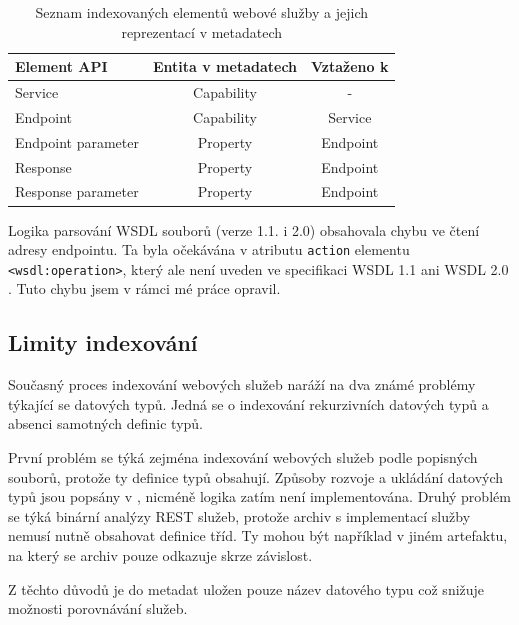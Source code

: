 \documentclass[czech,DP]{thesiskiv}
\begin{document}
\begin{table}[h]
	\centering
	\begin{tabular}{|l | c | c |}
		\hline
		Element API & Entita v metadatech & Vztaženo k \\
		\hline
		\hline
		Service & Capability & - \\
		\hline
		Endpoint & Capability & Service \\
		\hline
		Endpoint parameter & Property & Endpoint \\
		\hline
		Response & Property & Endpoint \\
		\hline
		Response parameter & Property & Endpoint \\
		\hline
	\end{tabular}
	\caption{Seznam indexovaných elementů webové služby a jejich reprezentací v metadatech}
	\label{tab:ws-indexed}
\end{table}

Logika parsování WSDL souborů (verze 1.1. i 2.0) obsahovala chybu ve čtení adresy endpointu. Ta byla očekávána v atributu \verb|action| elementu \verb|<wsdl:operation>|, který ale není uveden ve specifikaci WSDL 1.1 \cite{wsdl1} ani WSDL 2.0 \cite{wsdl2}. Tuto chybu jsem v rámci mé práce opravil.

\subsection{Limity indexování}

Současný proces indexování webových služeb naráží na dva známé problémy týkající se datových typů. Jedná se o indexování rekurzivních datových typů a absenci samotných definic typů.

První problém se týká zejména indexování webových služeb podle popisných souborů, protože ty definice typů obsahují. Způsoby rozvoje a ukládání datových typů jsou popsány v \cite{abadi1995subytping}, nicméně logika zatím není implementována. Druhý problém se týká binární analýzy REST služeb, protože archiv s implementací služby nemusí nutně obsahovat definice tříd. Ty mohou být například v jiném artefaktu, na který se archiv pouze odkazuje skrze závislost.

Z těchto důvodů je do metadat uložen pouze název datového typu což snižuje možnosti porovnávání služeb.

\end{document}
